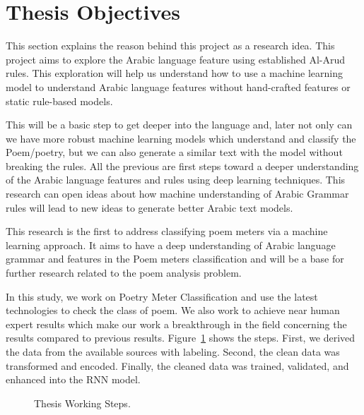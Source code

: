 \section{Thesis Objectives}
This section explains the reason behind this project as a research idea. This project aims to explore the Arabic language feature using established Al-Arud rules. This exploration will help us understand how to use a machine learning model to understand Arabic language features without hand-crafted features or static rule-based models.

This will be a basic step to get deeper into the language and, later not only can we have more robust machine learning models which understand and classify the Poem/poetry, but we can also generate a similar text with the model without breaking the rules. All the previous are first steps toward a deeper understanding of the Arabic language features and rules using deep learning techniques. This research can open ideas about how machine understanding of Arabic Grammar rules will lead to new ideas to generate better Arabic text models.

This research is the first to address classifying poem meters via a machine learning approach. It aims to have a deep understanding of Arabic language grammar and features in the Poem meters classification and will be a base for further research related to the poem analysis problem.

In this study, we work on Poetry Meter Classification and use the latest technologies to check the class of poem. We also work to achieve near human expert results which make our work a breakthrough in the field concerning the results compared to previous results. Figure~\ref{Fig:Thesis_Cycle} shows the steps. First, we derived the data from the available sources with labeling. Second, the clean data was transformed and encoded. Finally, the cleaned data was trained, validated, and enhanced into the RNN model.

\begin{figure}[!t]
   
  \caption{Thesis Working Steps.}
  \label{Fig:Thesis_Cycle}
\end{figure}

\clearpage

